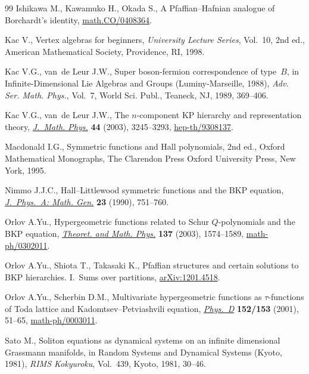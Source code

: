 \documentclass[pdftex]{sigma}
\numberwithin{equation}{section}
\begin{document}
\begin{thebibliography}{99}
Ishikawa M., Kawamuko H., Okada S., A Pfaf\/f\/ian--Hafnian analogue of Borchardt's
  identity, \href{http://arxiv.org/abs/math.CO/0408364}{math.CO/0408364}.

Kac V., Vertex algebras for beginners, \textit{University Lecture Series},
  Vol.~10, 2nd ed., American Mathematical Society, Providence, RI, 1998.

Kac V.G., van~de Leur J.W., Super boson-fermion correspondence of type~$B$, in
  Inf\/inite-Dimensional {L}ie Algebras and Groups ({L}uminy-{M}arseille, 1988),
  \textit{Adv. Ser. Math. Phys.}, Vol.~7, World Sci. Publ., Teaneck, NJ, 1989,
  369--406.

Kac V.G., van~de Leur J.W., The {$n$}-component {KP} hierarchy and
  representation theory, \href{http://dx.doi.org/10.1063/1.1590055}{\textit{J.~Math. Phys.}} \textbf{44} (2003),
  3245--3293, \href{http://arxiv.org/abs/hep-th/9308137}{hep-th/9308137}.

Macdonald I.G., Symmetric functions and {H}all polynomials, 2nd ed., Oxford
  Mathematical Monographs, The Clarendon Press Oxford University Press, New
  York, 1995.

Nimmo J.J.C., Hall--{L}ittlewood symmetric functions and the {BKP} equation,
  \href{http://dx.doi.org/10.1088/0305-4470/23/5/018}{\textit{J.~Phys.~A: Math. Gen.}} \textbf{23} (1990), 751--760.

Orlov A.Yu., Hypergeometric functions related to Schur $Q$-polynomials and the
  BKP equation, \href{http://dx.doi.org/10.1023/A:1027370004436}{\textit{Theoret. and Math. Phys.}} \textbf{137} (2003),
  1574--1589, \href{http://arxiv.org/abs/math-ph/0302011}{math-ph/0302011}.

Orlov A.Yu., Shiota T., Takasaki K.,
Pfaffian structures and certain solutions to BKP hierarchies. I.~Sums over partitions,
\href{http://arxiv.org/abs/1201.4518}{arXiv:1201.4518}.



Orlov A.Yu., Scherbin D.M., Multivariate hypergeometric functions as
  {$\tau$}-functions of {T}oda lattice and {K}adomtsev--{P}etviashvili
  equation, \href{http://dx.doi.org/10.1016/S0167-2789(01)00158-0}{\textit{Phys.~D}} \textbf{152/153} (2001), 51--65,  \href{http://arxiv.org/abs/math-ph/0003011}{math-ph/0003011}.

Sato M., Soliton equations as dynamical systems on an inf\/inite dimensional
  Grassmann manifolds, in Random Systems and Dynamical Systems (Kyoto, 1981),
  \textit{RIMS Kokyuroku}, Vol.~439, Kyoto, 1981, 30--46.


\end{thebibliography}
\end{document}
